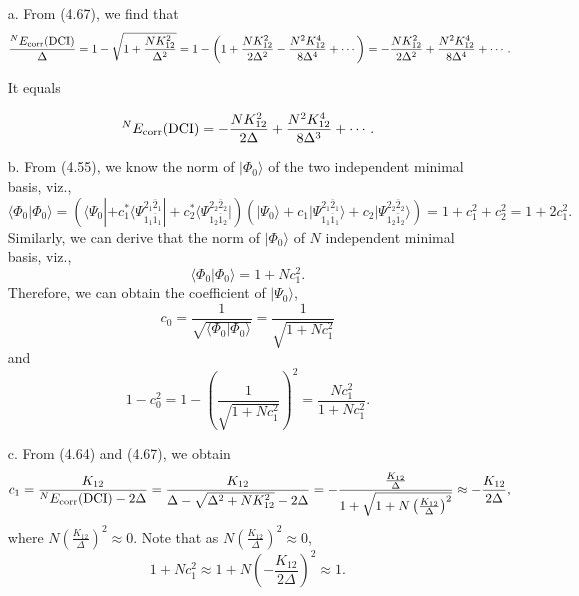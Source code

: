 \documentclass[a4paper]{book}
\newcommand{\corr}{{\rm corr}}
\begin{document}
	\begin{solution}
	
	\begin{itemize}
	
	\item[a.] From (4.67), we find that
	\[
		\frac{ ^N E_\corr ({\rm DCI})}{ \Delta } = 1 - \sqrt{ 1 + \frac{ N K^2_{12} }{ \Delta^2 } } = 1 - \left( 1 + \frac{ N K^2_{12} }{ 2\Delta^2 } - \frac{ N^2 K^4_{12} }{ 8\Delta^4 } + \cdots \right) = - \frac{ N K^2_{12} }{ 2\Delta^2 } + \frac{ N^2 K^4_{12} }{ 8\Delta^4 } + \cdots.
	\]
	
	It equals
	
	\begin{equation}
		^N E_\corr ({\rm DCI}) = - \frac{ N K^2_{12} }{ 2\Delta } + \frac{ N^2 K^4_{12} }{ 8\Delta^3 } + \cdots.
	\end{equation}
	
	\item[b.] From (4.55), we know the norm of $| \Phi_0 \rangle$ of the two independent minimal basis, viz.,
	\[
		\langle \Phi_0 | \Phi_0 \rangle = \left( \langle \Psi_0 | + c^*_1 \langle \Psi^{2_1 \bar{2}_1}_{1_1 \bar{1}_1} | + c^*_2  \langle \Psi^{2_2 \bar{2}_2}_{1_2 \bar{1}_2} | \right) \left( | \Psi_0 \rangle + c_1 | \Psi^{2_1 \bar{2}_1}_{1_1 \bar{1}_1} \rangle + c_2 | \Psi^{2_2 \bar{2}_2}_{1_2 \bar{1}_2} \rangle \right) = 1 + c^2_1 + c^2_2 = 1 + 2c^2_1.
	\]
	Similarly, we can derive that the norm of $| \Phi_0 \rangle$ of $N$ independent minimal basis, viz.,
	\[
		\langle \Phi_0 | \Phi_0 \rangle = 1 + Nc^2_1.
	\]
	Therefore, we can obtain the coefficient of $|\Psi_0\rangle$, 
	\[
		c_0 = \frac{1}{ \sqrt{ \langle \Phi_0 | \Phi_0 \rangle } } = \frac{1}{ \sqrt{ 1 + Nc^2_1 } }
	\]	
	and
	\begin{equation}
		1 - c^2_0 = 1 - \left( \frac{1}{ \sqrt{ 1 + Nc^2_1 } } \right)^2 = \frac{ N c^2_1 }{ 1 + Nc^2_1 }.
	\end{equation}
	
	\item[c.] From (4.64) and (4.67), we obtain
	\begin{equation}
		c_1 = \frac{ K_{12} }{ ^N E_\corr( {\rm DCI}  ) - 2\Delta } = \frac{ K_{12} }{ \Delta - \sqrt{ \Delta^2 + N K^2_{12} } - 2 \Delta } = - \frac{ \frac{ K_{12} }{ \Delta } }{ 1 + \sqrt{ 1 + N \left( \frac{ K_{12} }{ \Delta } \right)^2 } } \approx - \frac{ K_{12} }{ 2 \Delta },
	\end{equation}
	where $N \left( \frac{ K_{12} }{ \Delta } \right)^2 \approx 0$. Note that as $N \left( \frac{ K_{12} }{ \Delta } \right)^2 \approx 0$,
	\[
		1 + Nc^2_1 \approx 1 + N \left( - \frac{ K_{12} }{ 2 \Delta } \right)^2 \approx 1.
	\]
	

\end{itemize}
\end{solution}
\end{document}
